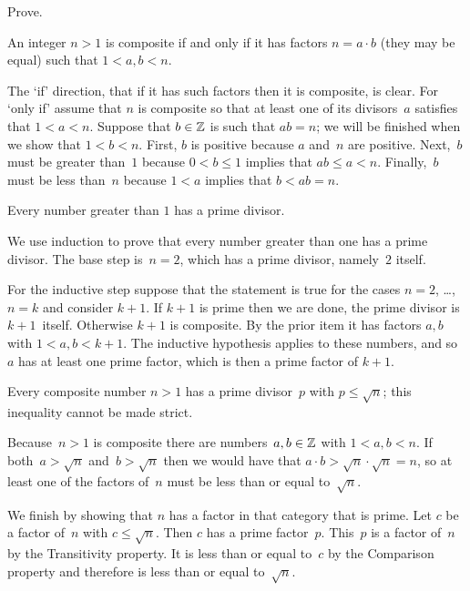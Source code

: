 \documentclass{ibl}  %
\begin{document}
\begin{problem} Prove.
\begin{exes}
\begin{exercise} 
  An integer $n>1$ is composite if and only if it has factors $n=a\cdot b$ 
  (they may be equal) 
  such that $1<a,b<n$.  
\end{exercise}
\begin{answer}
  The `if' direction, that if it has such factors then it is composite,
  is clear.
  For `only if' assume that $n$ is composite so
  that at least one of its divisors~$a$ satisfies that $1<a<n$.
  Suppose that $b\in\mathbb{Z}$ is such that $ab=n$; we will be finished when we show 
  that $1<b<n$.
  First, $b$ is positive because $a$ and~$n$ are positive.
  Next,~$b$ must be greater than~$1$ because $0<b\leq 1$ 
  implies that $ab\leq a<n$.
  Finally,~$b$ must be less than~$n$ because $1<a$ implies that $b<ab=n$.   
\end{answer}
\begin{exercise} 
  Every number greater than $1$ has a prime divisor.
\end{exercise}
\begin{answer}
  We use induction to prove that
  every number greater than one has a prime divisor.
  The base step is~$n=2$, which has a prime divisor, namely~$2$ itself.

  For the inductive step suppose that the statement is true for the cases 
  $n=2$, \ldots, $n=k$ and consider $k+1$.
  If $k+1$ is prime then we are done, the prime divisor is $k+1$~itself.
  Otherwise $k+1$ is composite.
  By the prior item it has factors $a,b$ with $1<a,b<k+1$.
  The inductive hypothesis applies to these numbers, and so~$a$ has at
  least one prime factor, which is then a prime factor of $k+1$.  
\end{answer}
\begin{exercise} 
  Every composite number $n>1$ has a prime divisor~$p$ 
  with $p\leq \sqrt{n}$; this inequality cannot be made strict.
\end{exercise}
\begin{answer}
  Because~$n>1$ is composite there are numbers~$a,b\in\mathbb{Z}$ with
  $1<a,b<n$.
  If both~$a>\sqrt{n}$ and~$b>\sqrt{n}$ then we would have that
  $a\cdot b>\sqrt{n}\cdot\sqrt{n}=n$,
  so at least one of the factors of~$n$ must be less than or equal 
  to~$\sqrt{n}$.

  We finish by showing that $n$ has a factor in that category that is prime.
  Let $c$ be a factor of~$n$ with $c\leq\sqrt{n}$.
  Then $c$ has a prime factor~$p$.
  This~$p$ is a factor of~$n$ by the Transitivity property. 
  It is 
  less than or equal to~$c$ by the Comparison property and therefore
  is less than or equal to~$\sqrt{n}$.    


\end{answer}
\end{exes}
\end{problem}
\end{document}
